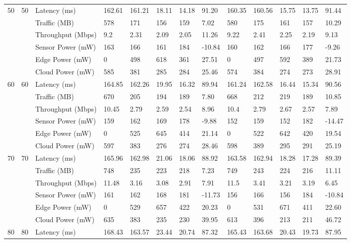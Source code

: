 \documentclass[11pt]{article}
\begin{document}
\begin{landscape}
\begin{longtable}{@{}lllllllllllll@{}}
			\multirow{6}{*}{50} & \multirow{6}{*}{50} & Latency (ms) & 162.61 & 161.21 & 18.11 & 14.18 & 91.20 & 160.35 & 160.56 & 15.75 & 13.75 & 91.44 \\
			& & Traffic (MB) & 578 & 171 & 156 & 159 & 7.02 & 580 & 175 & 161 & 157 & 10.29 \\
			& & Throughput (Mbps) & 9.2 & 2.31 & 2.09 & 2.05 & 11.26 & 9.22 & 2.41 & 2.25 & 2.19 & 9.13 \\
			& & Sensor Power (mW) & 163 & 166 & 161 & 184 & -10.84 & 160 & 162 & 166 & 177 & -9.26 \\
			& & Edge Power (mW) & 0 & 498 & 618 & 361 & 27.51 & 0 & 497 & 592 & 389 & 21.73 \\
			& & Cloud Power (mW) & 585 & 381 & 285 & 284 & 25.46 & 574 & 384 & 274 & 273 & 28.91 \\
			\midrule
			\multirow{6}{*}{60} & \multirow{6}{*}{60} & Latency (ms) & 164.85 & 162.26 & 19.95 & 16.32 & 89.94 & 161.24 & 162.58 & 16.44 & 15.34 & 90.56 \\
			& & Traffic (MB) & 670 & 205 & 194 & 189 & 7.80 & 668 & 212 & 219 & 189 & 10.85 \\
			& & Throughput (Mbps) & 10.45 & 2.79 & 2.59 & 2.54 & 8.96 & 10.4 & 2.79 & 2.67 & 2.57 & 7.89 \\
			& & Sensor Power (mW) & 159 & 162 & 169 & 178 & -9.88 & 152 & 159 & 152 & 182 & -14.47 \\
			& & Edge Power (mW) & 0 & 525 & 645 & 414 & 21.14 & 0 & 522 & 642 & 420 & 19.54 \\
			& & Cloud Power (mW) & 597 & 383 & 276 & 274 & 28.46 & 598 & 389 & 295 & 291 & 25.19 \\
			\midrule
			\multirow{6}{*}{70} & \multirow{6}{*}{70} & Latency (ms) & 165.96 & 162.98 & 21.06 & 18.06 & 88.92 & 163.58 & 162.94 & 18.28 & 17.28 & 89.39 \\
			& & Traffic (MB) & 748 & 235 & 223 & 218 & 7.23 & 749 & 243 & 224 & 216 & 11.11 \\
			& & Throughput (Mbps) & 11.48 & 3.16 & 3.08 & 2.91 & 7.91 & 11.5 & 3.41 & 3.21 & 3.19 & 6.45 \\
			& & Sensor Power (mW) & 161 & 162 & 168 & 181 & -11.73 & 156 & 166 & 156 & 184 & -10.84 \\
			& & Edge Power (mW) & 0 & 529 & 657 & 422 & 20.23 & 0 & 531 & 671 & 411 & 22.60 \\
			& & Cloud Power (mW) & 635 & 383 & 235 & 230 & 39.95 & 613 & 396 & 213 & 211 & 46.72 \\
			\midrule
			\multirow{6}{*}{80} & \multirow{6}{*}{80} & Latency (ms) & 168.43 & 163.57 & 23.44 & 20.74 & 87.32 & 165.43 & 163.68 & 20.43 & 19.73 & 87.95 \\

\end{longtable}
\end{landscape}
\end{document}
